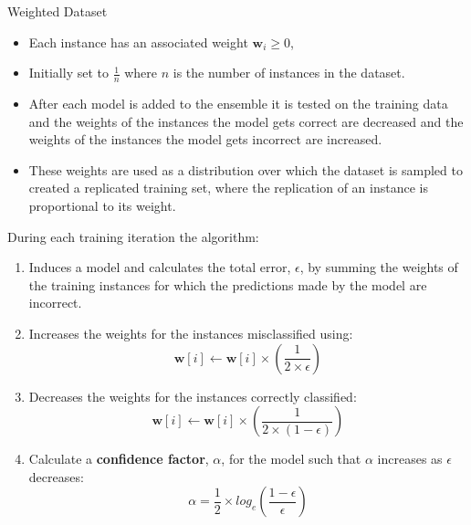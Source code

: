 \documentclass[xcolor={table}]{beamer}
\newcommand{\keyword}[1]{{\textbf{#1}}\index{#1}}
\begin{document}
\begin{frame}
	\begin{block}{Weighted Dataset}
		\begin{itemize}
			\item Each instance has an associated weight $\mathbf{w}_i\geq0$, 
			\item Initially set to $\frac{1}{n}$ where $n$ is the number of instances in the dataset. 
			\item After each model is added to the ensemble it is tested on the \alert{training data} and the weights of the instances the model gets correct are decreased and the weights of the instances the model gets incorrect are increased.
			\item These weights are used as a distribution over which the dataset is sampled to created a \alert{replicated training set}, where the replication of an instance is proportional to its weight.
		\end{itemize}
	\end{block}
\end{frame}

\begin{frame}
During each \alert{training iteration} the algorithm:
\begin{enumerate}
	\item Induces a model and calculates the total error, $\epsilon$, by summing the weights of the training instances for which the predictions made by the model are incorrect. 
	\item Increases the weights for the instances misclassified using:
\begin{equation}
	\mathbf{w}[i] \leftarrow \mathbf{w}[i] \times \left(\frac{1}{2 \times \epsilon}\right)
\end{equation}
\item Decreases the weights for the instances correctly classified:
\begin{equation}
	\mathbf{w}[i] \leftarrow \mathbf{w}[i]\times \left(\frac{1}{2 \times (1-\epsilon)}\right)
\end{equation}
	\item Calculate a \keyword{confidence factor}, $\alpha$, for the model such that $\alpha$ increases as $\epsilon$ decreases:
\begin{equation}
	\alpha = \frac{1}{2} \times log_e \left(\frac{1-\epsilon}{\epsilon}\right)
\end{equation}
\end{enumerate}
\end{frame}
\end{document}
